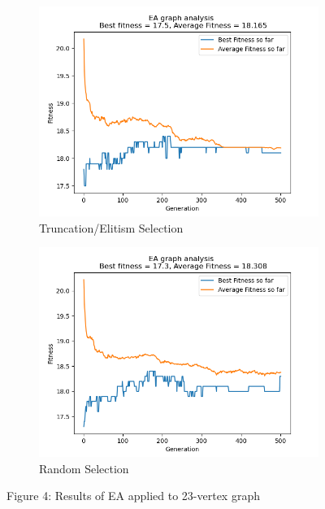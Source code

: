 \documentclass[conference,compsoc]{IEEEtran}
\begin{document}
\begin{figure}\ContinuedFloat
  \centering
  \begin{subfigure}{0.34\textwidth}
    \includegraphics[width=\linewidth]{../Results/_23_Truncation_Truncation_100_50_500.png}
    \caption{Truncation/Elitism Selection}
  \end{subfigure}
  \begin{subfigure}{0.34\textwidth}
    \includegraphics[width=\linewidth]{../Results/_23_Random_Truncation_100_50_500.png}
    \caption{Random Selection}
  \end{subfigure}
  \caption*{Figure 4: Results of EA applied to 23-vertex graph}
\end{figure}
\end{document}
